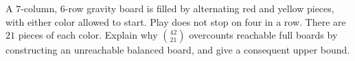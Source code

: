 A $7$-column, $6$-row gravity board is filled by alternating red and yellow pieces, with either color allowed to start. Play does not stop on four in a row. There are $21$ pieces of each color. Explain why $\binom{42}{21}$ overcounts reachable full boards by constructing an unreachable balanced board, and give a consequent upper bound.
